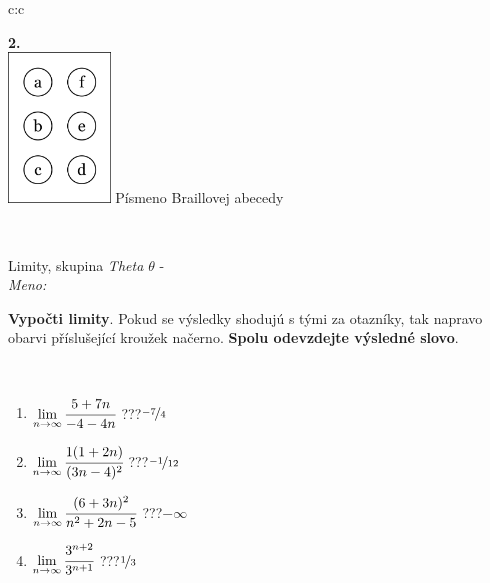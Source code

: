 \documentclass[10pt]{report}
\begin{document}
\begin{tabular}{c:c}
\begin{minipage}[c][104.5mm][t]{0.5\linewidth}
\begin{center}
\begin{minipage}{0.20\linewidth}
\begin{center}
{\Huge\bfseries 2.} \\[2mm]
\includegraphics[height=40mm]{../images/braille.png}
{\small Písmeno Braillovej abecedy}
\end{center}
\end{minipage}
\end{center}
\end{minipage}
\\ \hdashline
\begin{minipage}[c][104.5mm][t]{0.5\linewidth}
\begin{center}
\vspace{7mm}
{\huge Limity, skupina \textit{Theta $\theta$} -}\\[5mm]
\textit{Meno:}\phantom{xxxxxxxxxxxxxxxxxxxxxxxxxxxxxxxxxxxxxxxxxxxxxxxxxxxxxxxxxxxxxxxxx}\\[5mm]
\begin{minipage}{0.95\linewidth}
\begin{center}
\textbf{Vypočti limity}. Pokud se výsledky shodujú s tými za otazníky, tak napravo\\obarvi příslušející kroužek načerno. \textbf{Spolu odevzdejte výsledné slovo}.
\end{center}
\end{minipage}
\\[1mm]
\begin{minipage}{0.79\linewidth}
\begin{center}
\begin{varwidth}{\linewidth}
\begin{enumerate}
\normalsize
\item $\lim\limits_{n\to\infty}\cfrac{5+7n}{-4-4n}$\quad \dotfill\; ???\;\dotfill \quad $\nicefrac{-7}{4}$
\item $\lim\limits_{n\to\infty}\cfrac{1(1+2n)}{(3n-4)^2}$\quad \dotfill\; ???\;\dotfill \quad $\nicefrac{-1}{12}$
\item $\lim\limits_{n\to\infty}\cfrac{(6+3n)^2}{n^2+2n-5}$\quad \dotfill\; ???\;\dotfill \quad $-\infty$
\item $\lim\limits_{n\to\infty}\cfrac{3^{n+2}}{3^{n+1}}$\quad \dotfill\; ???\;\dotfill \quad $\nicefrac{1}{3}$

\end{enumerate}
\end{varwidth}
\end{center}
\end{minipage}
\end{center}
\end{minipage}
\end{tabular}
\end{document}
